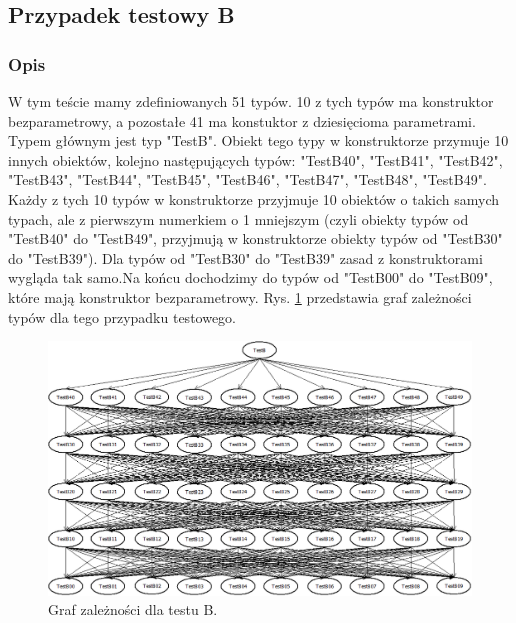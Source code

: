 \documentclass[12pt]{article}
\begin{document}
\subsection{Przypadek testowy B}
\subsubsection{Opis}
W tym teście mamy zdefiniowanych 51 typów. 10 z tych typów ma konstruktor bezparametrowy, a pozostałe 41 ma konstuktor z dziesięcioma parametrami. Typem głównym jest typ "TestB". Obiekt tego typy w konstruktorze przymuje 10 innych obiektów, kolejno następujących typów: "TestB40", "TestB41", "TestB42", "TestB43", "TestB44", "TestB45", "TestB46", "TestB47", "TestB48", "TestB49". Każdy z tych 10 typów w konstruktorze przyjmuje 10 obiektów o takich samych typach, ale z pierwszym numerkiem o 1 mniejszym (czyli obiekty typów od "TestB40" do "TestB49", przyjmują w konstruktorze obiekty typów od "TestB30" do "TestB39"). Dla typów od "TestB30" do "TestB39" zasad z konstruktorami wygląda tak samo.Na końcu dochodzimy do typów od "TestB00" do "TestB09", które mają konstruktor bezparametrowy. Rys. \ref{fig:testB} przedstawia graf zależności typów dla tego przypadku testowego.

\clearpage
\begin{figure}[h]
	\begin{center}
  		\includegraphics[width=\linewidth]{TestB.png}
  		\caption{Graf zależności dla testu B.}
  		\label{fig:testB}
	\end{center}
\end{figure}
\end{document}
